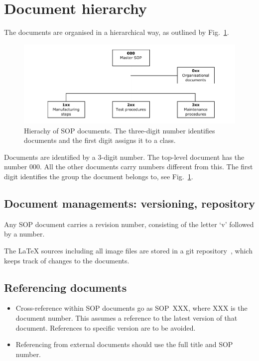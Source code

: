 \documentclass[12pt]{cnihepsop}
\begin{document}
\section{Document hierarchy}
The documents are organised in a hierarchical way, as outlined by Fig.~\ref{fig:SOPhierarchy}.
\begin{figure}[h]
    \begin{center}
        \includegraphics[width=16cm]{img/SOPhierarchy.pdf}
        \caption{Hierachy of SOP documents. The three-digit number identifies documents and the first digit assigns it to a class.}
        \label{fig:SOPhierarchy}
    \end{center}
\end{figure}
Documents are identified by a 3-digit number. The top-level document has the number 000. All the other documents carry numbers different from this. The first digit identifies the group the document belongs to, see Fig.~\ref{fig:SOPhierarchy}.

\subsection{Document managements: versioning, repository}
Any SOP document carries a revision number, consisting of the letter `v' followed by a number. 

The \LaTeX{} sources including all image files are stored in a git repository~\cite{SOPgit}, which keeps track of changes to the documents.

\subsection{Referencing documents}
\begin{itemize}
    \item Cross-reference within SOP documents go as SOP~XXX, where XXX is the document number. This assumes a reference to the latest version of that document. References to specific version are to be avoided.
    \item Referencing from external documents should use the full title and SOP number.
\end{itemize}
\end{document}
